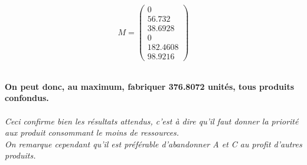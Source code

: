 \begin{displaymath}
M = \left(
\begin{array}{c}
0\\
56.732\\
38.6928\\
0\\
182.4608\\
98.9216 
\end{array}
\right)
\end{displaymath}
~\\
\begin{center}
\textbf{On peut donc, au maximum, fabriquer 376.8072 unités, tous produits
confondus.}\\
~\\
\textsl{Ceci confirme bien les résultats attendus, c'est à dire
qu'il faut donner la priorité aux produit consommant le moins de ressources.\\
On remarque cependant qu'il est préférable d'abandonner \textsl{A} et \textsl{C}
au profit d'autres produits.}
\end{center}
